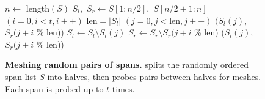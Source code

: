 \iffalse
\begin{algorithm}[tb]
  \SetAlgorithmName{\sm}{}{}
  \SetKwInOut{Input}{Input}
  \SetKwInOut{Output}{Output}
  \Input{randomly ordered list of spans S, $|S| = n$; parameter $t$}

  M $ \leftarrow$ []\;

  $S_l,$ $S_r = S[1:\frac{n}{2}],$ $S[\frac{n}{2}+1 : n]$\;
  \ForEach{$i \in [0, t-1]$}{
    len = length$(S_l)$\;
    \ForEach{$j \in [0, \frac{n}{2}-1]$}{
      \If{$S_l(j)$ and $S_r(j+i$ mod len) mesh}{
        $S_l \leftarrow S_l \textbackslash S_l(j)$\;
        $S_r \leftarrow S_r \textbackslash S_r(j+i$ mod len)\;
        M $\leftarrow$ M $\cup$ $S_l(j)$ $\cup$ $S_r(j+i$ mod len)\;
      }
    }
  }
  \Return M\;
  \TitleOfAlgo{Procedure splits span set into halves and probes for meshable pairs between halves.}
\end{algorithm}
\fi

\begin{figure}[!t]
\begin{codebox}
    \li $n \gets$ length$(S)$
    \li $S_l,$ $S_r \gets S[1:n/2],$ $S[n/2 +1 : n]$
    \li \For $(i = 0, i<t, i++)$ \label{li:outerloop}
        \li \Do
            $\mbox{len} = |S_l|$\;
            \li \For $(j = 0, j < \mbox{len}, j++)$ \label{li:innerloop}
                \li \Do
                    \If {} $(S_l(j)$, $S_r(j+i$ \% $\mbox{len}$)) \Then \label{li:condition}
                        \li $S_l \leftarrow S_l \setminus S_l(j)$ \label{li:remove}
                        \li $S_r \leftarrow S_r \setminus S_r(j+i$ \% $\mbox{len}$)
                        \li {}($ S_l(j)$, $S_r(j+i$ \% $\mbox{len}$)) \label{li:mesh}
                    \End
                \End
        \End
\end{codebox}
\caption{\textbf{Meshing random pairs of spans.} \sm splits the randomly ordered span list $S$ into halves, then probes pairs between halves for meshes.  Each span is probed up to $t$ times.}
\label{fig:meshalg}
\end{figure}
